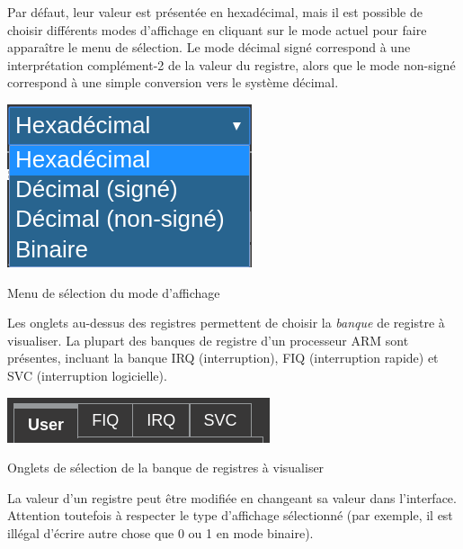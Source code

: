 \documentclass{tufte-handout}
\begin{document}
Par défaut, leur valeur est présentée en hexadécimal, mais il est possible de choisir différents modes d'affichage en cliquant sur le mode actuel pour faire apparaître le menu de sélection. Le mode décimal signé correspond à une interprétation complément-2 de la valeur du registre, alors que le mode non-signé correspond à une simple conversion vers le système décimal.
\begin{marginfigure}
\includegraphics[width=0.8\linewidth]{pics/registres_format.png}
\label{f:regformat}
\caption{Menu de sélection du mode d'affichage}
\end{marginfigure}

Les onglets au-dessus des registres permettent de choisir la \textit{banque} de registre à visualiser. La plupart des banques de registre d'un processeur ARM sont présentes, incluant la banque IRQ (interruption), FIQ (interruption rapide) et SVC (interruption logicielle).
\begin{marginfigure}
\includegraphics[width=\linewidth]{pics/registres_banques.png}
\label{f:regbank}
\caption{Onglets de sélection de la banque de registres à visualiser}
\end{marginfigure}

La valeur d'un registre peut être modifiée en changeant sa valeur dans l'interface. Attention toutefois à respecter le type d'affichage sélectionné (par exemple, il est illégal d'écrire autre chose que 0 ou 1 en mode binaire).
\end{document}

